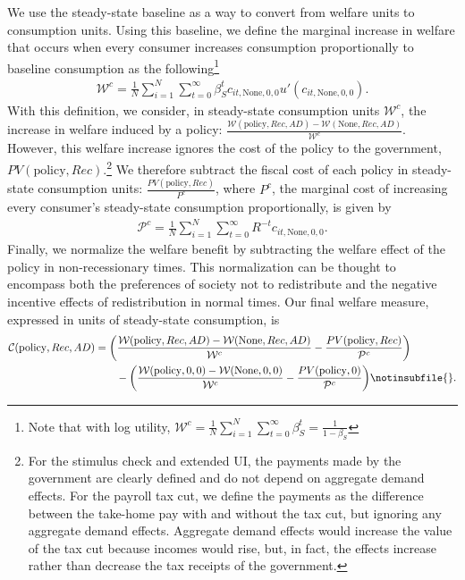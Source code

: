 \documentclass[\econtexRoot/HAFiscal]{subfiles}
\begin{document}
We use the steady-state baseline as a way to convert from welfare units to consumption units. Using this baseline, we define the marginal increase in welfare that occurs when every consumer increases consumption proportionally to baseline consumption as the following\footnote{Note that with log utility, $\mathcal{W}^c =\frac{1}{N}\sum_{i=1}^{N} \sum_{t=0}^{\infty} \beta_S^t = \frac{1}{1-\beta_S}$}
\begin{align}
	\mathcal{W}^c =\frac{1}{N}\sum_{i=1}^{N} \sum_{t=0}^{\infty} \beta_S^t c_{it,\text{None},0,0} u'(c_{it,\text{None},0,0}) .
\end{align}
With this definition, we consider, in steady-state consumption units $\mathcal{W}^c$, the increase in welfare induced by a policy: $\frac{\mathcal{W}(\text{policy},Rec,AD)-\mathcal{W}(\text{None},Rec,AD)}{\mathcal{W}^c}$. However, this welfare increase ignores the cost of the policy to the government, $PV(\text{policy},Rec)$.\footnote{For the stimulus check and extended UI, the payments made by the government are clearly defined and do not depend on aggregate demand effects. For the payroll tax cut, we define the payments as the difference between the take-home pay with and without the tax cut, but ignoring any aggregate demand effects. Aggregate demand effects would increase the value of the tax cut because incomes would rise, but, in fact, the effects increase rather than decrease the tax receipts of the government.} We therefore subtract the fiscal cost of each policy in steady-state consumption units:  $\frac{PV(\text{policy},Rec)}{{P}^c}$, where ${P}^c$, the marginal cost of increasing every consumer's steady-state consumption proportionally, is given by
\begin{align}
	\mathcal{P}^c = \frac{1}{N}\sum_{i=1}^{N} \sum_{t=0}^{\infty} R^{-t} c_{it,\text{None},0,0} .
\end{align}
Finally, we normalize the welfare benefit by subtracting the welfare effect of the policy in non-recessionary times. This normalization can be thought to encompass both the preferences of society not to redistribute and the negative incentive effects of redistribution in normal times. Our final welfare measure, expressed in units of steady-state consumption, is
\begin{align}
	\mathcal{C}(\text{policy},Rec,AD) &= \bigg(\frac{\mathcal{W}(\text{policy},Rec,AD)-\mathcal{W}(\text{None},Rec,AD)}{\mathcal{W}^c} - \frac{PV(\text{policy},Rec)}{\mathcal{P}^c} \bigg) \nonumber \\  
	& \qquad -
	\bigg(\frac{\mathcal{W}(\text{policy},0,0) - \mathcal{W}(\text{None},0,0)}{\mathcal{W}^c} - \frac{PV(\text{policy},0)}{\mathcal{P}^c} \bigg) \notinsubfile{\label{welfare_defn}}.
\end{align}
\end{document}
